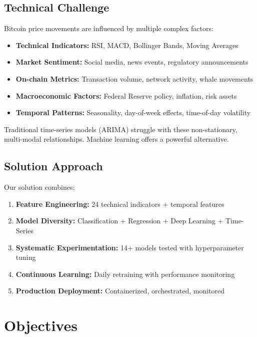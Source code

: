 \subsection{Technical Challenge}
Bitcoin price movements are influenced by multiple complex factors:
\begin{itemize}
    \item \textbf{Technical Indicators:} RSI, MACD, Bollinger Bands, Moving Averages
    \item \textbf{Market Sentiment:} Social media, news events, regulatory announcements
    \item \textbf{On-chain Metrics:} Transaction volume, network activity, whale movements
    \item \textbf{Macroeconomic Factors:} Federal Reserve policy, inflation, risk assets
    \item \textbf{Temporal Patterns:} Seasonality, day-of-week effects, time-of-day volatility
\end{itemize}

Traditional time-series models (ARIMA) struggle with these non-stationary, multi-modal relationships. Machine learning offers a powerful alternative.

\subsection{Solution Approach}
Our solution combines:
\begin{enumerate}
    \item \textbf{Feature Engineering:} 24 technical indicators + temporal features
    \item \textbf{Model Diversity:} Classification + Regression + Deep Learning + Time-Series
    \item \textbf{Systematic Experimentation:} 14+ models tested with hyperparameter tuning
    \item \textbf{Continuous Learning:} Daily retraining with performance monitoring
    \item \textbf{Production Deployment:} Containerized, orchestrated, monitored
\end{enumerate}

\section{Objectives}

